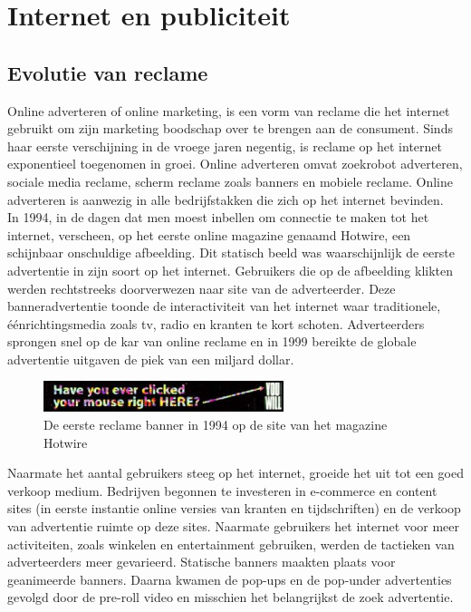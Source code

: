 \documentclass[pdftex,a4paper,12pt,twoside]{report}
\begin{document}
\chapter{Internet en publiciteit}
\label{ch:Internet en publiciteit}

\section{Evolutie van reclame}
\label{sec:Evolutie van reclame}
Online adverteren of online marketing, is een vorm van reclame die het internet gebruikt om zijn marketing boodschap over te brengen aan de consument. Sinds haar eerste verschijning in de vroege jaren negentig, is reclame op het internet exponentieel toegenomen in groei. Online adverteren omvat zoekrobot adverteren, sociale media reclame, scherm reclame zoals banners en mobiele reclame. Online adverteren is aanwezig in alle bedrijfstakken die zich op het internet bevinden.
\\
In 1994, in de dagen dat men moest inbellen om connectie te maken tot het internet, verscheen, op het eerste online magazine genaamd Hotwire, een schijnbaar onschuldige afbeelding. Dit statisch beeld was waarschijnlijk de eerste advertentie in zijn soort op het internet. Gebruikers die op de afbeelding klikten werden rechtstreeks doorverwezen naar site van de adverteerder. Deze banneradvertentie toonde de interactiviteit van het internet waar traditionele, éénrichtingsmedia zoals tv, radio en kranten te kort schoten. Adverteerders sprongen snel op de kar van online reclame en in 1999 bereikte de globale advertentie uitgaven de piek van een miljard dollar.
\begin{figure}[h!]
\centering
\includegraphics[width=7cm]{img/firstbanner}
\caption{De eerste reclame banner in 1994 op de site van het magazine Hotwire}
\label{fig: Banner-Ads}
\end{figure}
Naarmate het aantal gebruikers steeg op het internet, groeide het uit tot een goed verkoop medium. Bedrijven begonnen te investeren in e-commerce en content sites (in eerste instantie online versies van kranten en tijdschriften) en de verkoop van advertentie ruimte op deze sites. Naarmate gebruikers het internet voor meer activiteiten, zoals winkelen en entertainment gebruiken, werden de tactieken van adverteerders meer gevarieerd. Statische banners maakten plaats voor geanimeerde banners. Daarna kwamen de pop-ups en de pop-under advertenties gevolgd door de pre-roll video en misschien het belangrijkst de zoek advertentie. 
\end{document}
